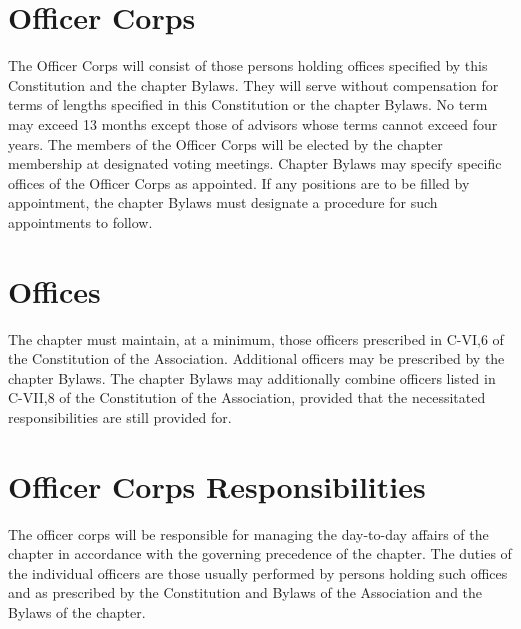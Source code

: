 \section{Officer Corps}
The Officer Corps will consist of those persons holding offices specified by this Constitution and the chapter Bylaws.
They will serve without compensation for terms of lengths specified in this Constitution or the chapter Bylaws.
No term may exceed 13 months except those of advisors whose terms cannot exceed four years.
The members of the Officer Corps will be elected by the chapter membership at designated voting meetings.
Chapter Bylaws may specify specific offices of the Officer Corps as appointed.
If any positions are to be filled by appointment, the chapter Bylaws must designate a procedure for such appointments to follow.

\section{Offices}
The chapter must maintain, at a minimum, those officers prescribed in C-VI,6 of the Constitution of the Association.
Additional officers may be prescribed by the chapter Bylaws.
The chapter Bylaws may additionally combine officers listed in C-VII,8 of the Constitution of the Association, provided that the necessitated responsibilities are still provided for.

\section{Officer Corps Responsibilities}
The officer corps will be responsible for managing the day-to-day affairs of the chapter in accordance with the governing precedence of the chapter.
The duties of the individual officers are those usually performed by persons holding such offices and as prescribed by the Constitution and Bylaws of the Association and the Bylaws of the chapter.

